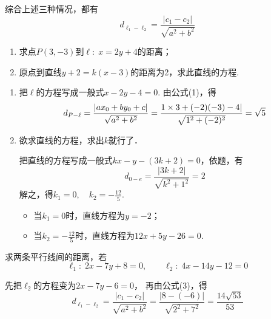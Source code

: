 综合上述三种情况，都有
\begin{equation}
    d_{\ell_1-\ell_2}=\frac{|c_1-c_2|}{\sqrt{a^2+b^2}} \tag{3}
\end{equation}

\begin{example}
\begin{enumerate}[(1)]
    \item 求点$P(3,-3)$到$\ell:\; x=2y+4$的距离；
    \item 原点到直线$y+2=k(x-3)$的距离为2，求此直线的方程.
\end{enumerate}
\end{example}

\begin{solution}
\begin{enumerate}[(1)]
    \item 把$\ell$的方程写成一般式$x-2y-4=0$.
由公式(1)，得
\[d_{P-\ell}=\dfrac{|ax_0+by_0+c|}{\sqrt{a^2+b^2}}=\dfrac{1\times 3+(-2)(-3)-4|}{\sqrt{1^2+(-2)^2}}=\sqrt{5}\]
\item 欲求直线的方程，求出$k$就行了．

把直线的方程写成一般式$kx-y-(3k+2)=0$，依题，有
\[d_{0-e}=\frac{|3k+2|}{\sqrt{k^2+1^2}}=2\]
解之，得$k_1=0,\quad k_2=-\frac{12}{5}$.
\begin{itemize}
    \item 当$k_1=0$时，直线方程为$y=-2$；
    \item 当$k_2=-\frac{12}{5}$时，直线方程为$12x+5y-26=0$.
\end{itemize}
\end{enumerate}
\end{solution}

\begin{example}
求两条平行线间的距离，若
$$\ell_1:\; 2x-7y+8=0,\qquad \ell_2:\; 4x-14y-12=0$$
\end{example}   

\begin{solution}
先把$\ell_2$的方程变为$2x-7y-6=0$，
再由公式(3)，得
\[d_{\ell_1-\ell_2}=\frac{|c_1-c_2|}{\sqrt{a^2+b^2}}=\frac{|8-(-6)|}{\sqrt{2^2+7^2}}=\frac{14\sqrt{53}}{53}\]
\end{solution}

